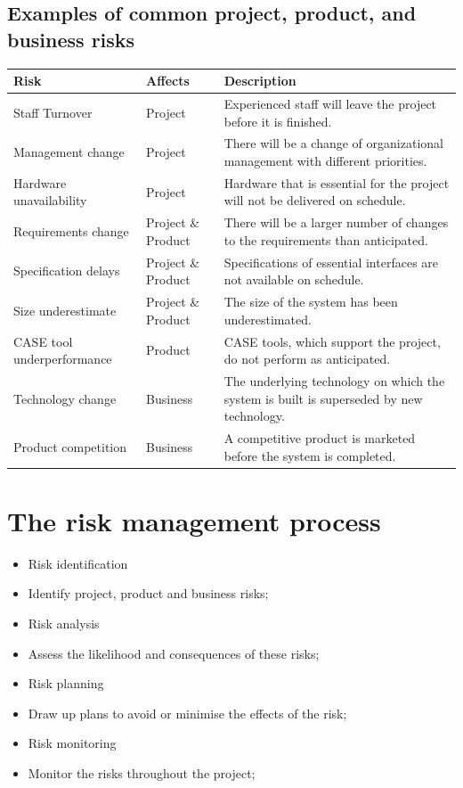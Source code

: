 \newpage
\subsection{ Examples of common project, product, and business risks}

\begin{table}[h!]
\centering
\begin{tabular}{ |p{2cm}|p{2cm}|p{8cm}|  }
\hline
Risk & Affects & Description\\
\hline
\hline
Staff Turnover & Project & Experienced staff will leave the project before it is finished.\\
\hline
Management change & Project & There will be a change of organizational management with different priorities.\\
\hline
Hardware unavailability & Project & Hardware that is essential for the project will not be delivered on schedule.\\
\hline
Requirements change & Project \& Product & There will be a larger number of changes to the requirements than anticipated.\\
\hline
Specification delays & Project \& Product & Specifications of essential interfaces are not available on schedule.\\
\hline
Size underestimate & Project \& Product & The size of the system has been underestimated.\\
\hline
CASE tool underperformance & Product & CASE tools, which support the project, do not perform as anticipated.\\
\hline
Technology change & Business & The underlying technology on which the system is built is superseded by new technology.\\
\hline
Product competition & Business & A competitive product is marketed before the system is completed.\\
\hline
\end{tabular}

\label{table:T5_1}
\end{table}


\section{ The risk management process}
\begin{itemize}

\item Risk identification

  \item Identify project, product and business risks; \item Risk analysis
  \item Assess the likelihood and consequences of these risks; \item Risk planning
  \item Draw up plans to avoid or minimise the effects of the risk; \item Risk monitoring
  \item Monitor the risks throughout the project;

\end{itemize}

